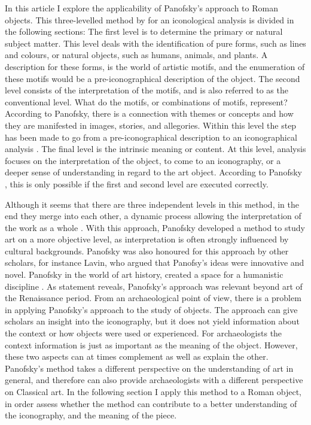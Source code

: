 In this article I explore the applicability of Panofsky’s approach to Roman objects. This three-levelled method by \textcite {Panofsky_1939} for an iconological analysis is divided in the following sections: The first level is to determine the primary or natural subject matter. This level deals with the identification of pure forms, such as lines and colours, or natural objects, such as humans, animals, and plants. A description for these forms, is the world of artistic motifs, and the enumeration of these motifs would be a pre-iconographical description of the object. The second level consists of the interpretation of the motifs, and is also referred to as the conventional level. What do the motifs, or combinations of motifs, represent? According to Panofsky, there is a connection with themes or concepts and how they are manifested in images, stories, and allegories. Within this level the step has been made to go from a pre-iconographical description to an iconographical analysis \parencite[5--7]{Panofsky_1939}. The final level is the intrinsic meaning or content. At this level, analysis focuses on the interpretation of the object, to come to an iconography, or a deeper sense of understanding in regard to the art object. According to Panofsky \parencite{Panofsky_1939}, this is only possible if the first and second level are executed correctly.

	Although it seems that there are three independent levels in this method, in the end they merge into each other, a dynamic process allowing the interpretation of the work as a whole \parencite [17]{Panofsky_1939}. With this approach, Panofsky developed a method to study art on a more objective level, as interpretation is often strongly influenced by cultural backgrounds. Panofsky was also honoured for this approach by other scholars, for instance Lavin, who argued that Panofsy’s ideas were innovative and novel. Panofsky in the world of art history, created a space for a humanistic discipline \parencite[6]{Lavin_1995}. As \textcite{Lavin_1995} statement reveals, Panofsky’s approach was relevant beyond art of the Renaissance period.
	From an archaeological point of view, there is a problem in applying Panofsky’s approach to the study of objects. The approach can give scholars an insight into the iconography, but it does not yield information about the context or how objects were used or experienced. For archaeologists the context information is just as important as the meaning of the object. However, these two aspects can at times complement as well as explain the other. 
	Panofsky’s method takes a different perspective on the understanding of art in general, and therefore can also provide archaeologists with a different perspective on Classical art. In the following section I apply this method to a Roman object, in order assess whether the method can contribute to a better understanding of the iconography, and the meaning of the piece.
	

